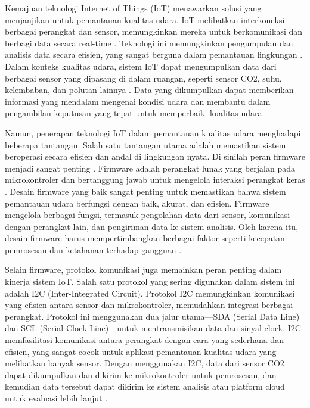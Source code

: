     Kemajuan teknologi Internet of Things (IoT) menawarkan solusi yang menjanjikan untuk pemantauan kualitas udara. IoT melibatkan interkoneksi berbagai perangkat dan sensor, memungkinkan mereka untuk berkomunikasi dan berbagi data secara real-time \cite{iot}. Teknologi ini memungkinkan pengumpulan dan analisis data secara efisien, yang sangat berguna dalam pemantauan lingkungan \cite{iot2, iot3, iot4, iot5}. Dalam konteks kualitas udara, sistem IoT dapat mengumpulkan data dari berbagai sensor yang dipasang di dalam ruangan, seperti sensor CO2, suhu, kelembaban, dan polutan lainnya \cite{Marzouk2022Assessment}. Data yang dikumpulkan dapat memberikan informasi yang mendalam mengenai kondisi udara dan membantu dalam pengambilan keputusan yang tepat untuk memperbaiki kualitas udara.
    
    Namun, penerapan teknologi IoT dalam pemantauan kualitas udara menghadapi beberapa tantangan. Salah satu tantangan utama adalah memastikan sistem beroperasi secara efisien dan andal di lingkungan nyata. Di sinilah peran firmware menjadi sangat penting \cite{Toma2019IoT}. Firmware adalah perangkat lunak yang berjalan pada mikrokontroler dan bertanggung jawab untuk mengelola interaksi perangkat keras \cite{Sun2023Feature}. Desain firmware yang baik sangat penting untuk memastikan bahwa sistem pemantauan udara berfungsi dengan baik, akurat, dan efisien. Firmware mengelola berbagai fungsi, termasuk pengolahan data dari sensor, komunikasi dengan perangkat lain, dan pengiriman data ke sistem analisis. Oleh karena itu, desain firmware harus mempertimbangkan berbagai faktor seperti kecepatan pemrosesan dan ketahanan terhadap gangguan \cite{Oliveira2023Investigating}.
    
    Selain firmware, protokol komunikasi juga memainkan peran penting dalam kinerja sistem IoT. Salah satu protokol yang sering digunakan dalam sistem ini adalah I2C (Inter-Integrated Circuit). Protokol I2C memungkinkan komunikasi yang efisien antara sensor dan mikrokontroler, memudahkan integrasi berbagai perangkat. Protokol ini menggunakan dua jalur utama—SDA (Serial Data Line) dan SCL (Serial Clock Line)—untuk mentransmisikan data dan sinyal clock. I2C memfasilitasi komunikasi antara perangkat dengan cara yang sederhana dan efisien, yang sangat cocok untuk aplikasi pemantauan kualitas udara yang melibatkan banyak sensor. Dengan menggunakan I2C, data dari sensor CO2 dapat dikumpulkan dan dikirim ke mikrokontroler untuk pemrosesan, dan kemudian data tersebut dapat dikirim ke sistem analisis atau platform cloud untuk evaluasi lebih lanjut \cite{nxp}.
    
